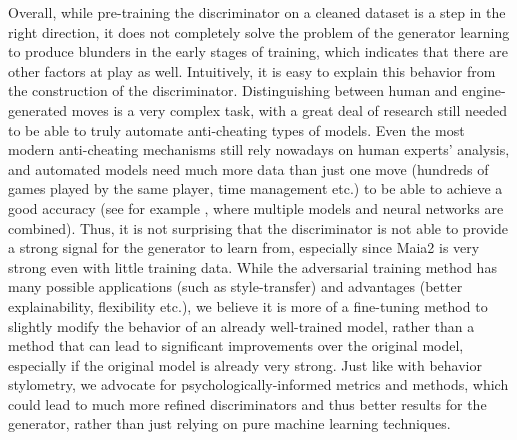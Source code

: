 Overall, while pre-training the discriminator on a cleaned dataset is a step in the right direction, it does not completely solve the problem of the generator learning to produce blunders in the early stages of training, which indicates that there are other factors at play as well.
Intuitively, it is easy to explain this behavior from the construction of the discriminator.
Distinguishing between human and engine-generated moves is a very complex task, with a great deal of research still needed to be able to truly automate anti-cheating types of models.
Even the most modern anti-cheating mechanisms still rely nowadays on human experts' analysis, and automated models need much more data than just one move (hundreds of games played by the same player, time management etc.) to be able to achieve a good accuracy (see for example \cite{chess_anticheat}, where multiple models and neural networks are combined).
Thus, it is not surprising that the discriminator is not able to provide a strong signal for the generator to learn from, especially since Maia2 is very strong even with little training data.
While the adversarial training method has many possible applications (such as style-transfer) and advantages (better explainability, flexibility etc.), we believe it is more of a fine-tuning method to slightly modify the behavior of an already well-trained model, rather than a method that can lead to significant improvements over the original model, especially if the original model is already very strong.
Just like with behavior stylometry, we advocate for psychologically-informed metrics and methods, which could lead to much more refined discriminators and thus better results for the generator, rather than just relying on pure machine learning techniques.